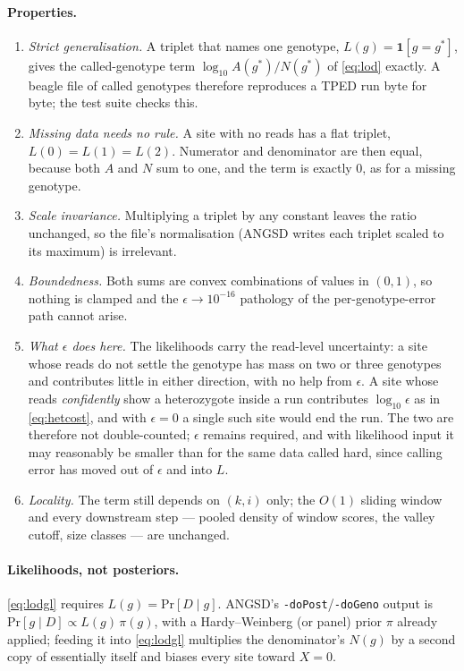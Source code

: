 \documentclass[11pt]{article}
\renewcommand{\Pr}[1]{\mathrm{Pr}\!\left[#1\right]}
\newcommand{\code}[1]{\texttt{#1}}
\begin{document}
\paragraph{Properties.}
\begin{enumerate}
\item \emph{Strict generalisation.} A triplet that names one genotype, $L(g) = \mathbf{1}[g = g^\ast]$, gives the called-genotype term $\log_{10} A(g^\ast)/N(g^\ast)$ of \eqref{eq:lod} exactly. A beagle file of called genotypes therefore reproduces a TPED run byte for byte; the test suite checks this.
\item \emph{Missing data needs no rule.} A site with no reads has a flat triplet, $L(0) = L(1) = L(2)$. Numerator and denominator are then equal, because both $A$ and $N$ sum to one, and the term is exactly $0$, as for a missing genotype.
\item \emph{Scale invariance.} Multiplying a triplet by any constant leaves the ratio unchanged, so the file's normalisation (ANGSD writes each triplet scaled to its maximum) is irrelevant.
\item \emph{Boundedness.} Both sums are convex combinations of values in $(0,1)$, so nothing is clamped and the $\epsilon \to 10^{-16}$ pathology of the per-genotype-error path cannot arise.
\item \emph{What $\epsilon$ does here.} The likelihoods carry the read-level uncertainty: a site whose reads do not settle the genotype has mass on two or three genotypes and contributes little in either direction, with no help from $\epsilon$. A site whose reads \emph{confidently} show a heterozygote inside a run contributes $\log_{10} \epsilon$ as in \eqref{eq:hetcost}, and with $\epsilon = 0$ a single such site would end the run. The two are therefore not double-counted; $\epsilon$ remains required, and with likelihood input it may reasonably be smaller than for the same data called hard, since calling error has moved out of $\epsilon$ and into $L$.
\item \emph{Locality.} The term still depends on $(k,i)$ only; the $O(1)$ sliding window and every downstream step --- pooled density of window scores, the valley cutoff, size classes --- are unchanged.
\end{enumerate}

\paragraph{Likelihoods, not posteriors.} \eqref{eq:lodgl} requires $L(g) = \Pr{D \mid g}$. ANGSD's \code{-doPost}/\code{-doGeno} output is $\Pr{g \mid D} \propto L(g)\,\pi(g)$, with a Hardy--Weinberg (or panel) prior $\pi$ already applied; feeding it into \eqref{eq:lodgl} multiplies the denominator's $N(g)$ by a second copy of essentially itself and biases every site toward $X = 0$.
\end{document}
